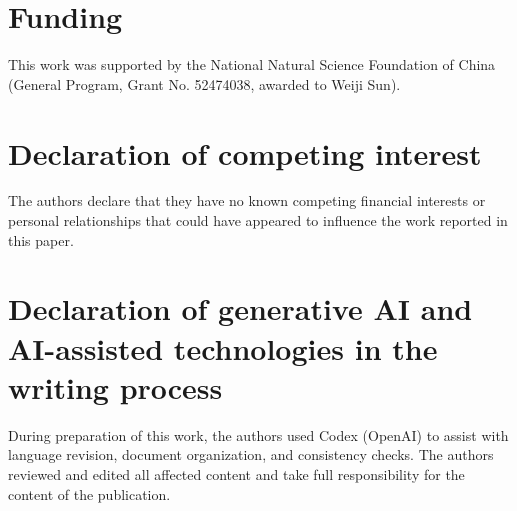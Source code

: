 \documentclass[preprint,12pt]{elsarticle}
\begin{document}
\section*{Funding}
This work was supported by the National Natural Science Foundation of China (General Program, Grant No. 52474038, awarded to Weiji Sun).

\section*{Declaration of competing interest}
The authors declare that they have no known competing financial interests or personal relationships that could have appeared to influence the work reported in this paper.

\section*{Declaration of generative AI and AI-assisted technologies in the writing process}
During preparation of this work, the authors used Codex (OpenAI) to assist with language revision, document organization, and consistency checks. The authors reviewed and edited all affected content and take full responsibility for the content of the publication.



\end{document}
